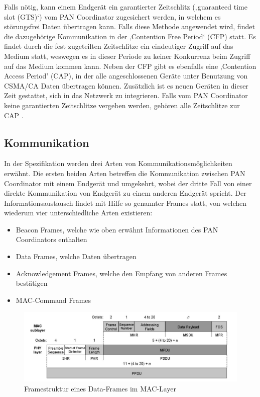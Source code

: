 Falls nötig, kann einem Endgerät ein garantierter Zeitschlitz (‚guaranteed time slot (GTS)‘) vom PAN Coordinator zugesichert werden, in welchem es störungsfrei Daten übertragen kann. Falls diese Methode angewendet wird, findet die dazugehörige Kommunikation in der ‚Contention Free Period‘ (CFP) statt. Es findet durch die fest zugeteilten Zeitschlitze ein eindeutiger Zugriff auf das Medium statt, weswegen es in dieser Periode zu keiner Konkurrenz beim Zugriff auf das Medium kommen kann. Neben der CFP gibt es ebenfalls eine ,Contention Access Period’ (CAP), in der alle angeschlossenen Geräte unter Benutzung von CSMA/CA Daten übertragen können. Zusätzlich ist es neuen Geräten in dieser Zeit gestattet, sich in das Netzwerk zu integrieren. Falls vom PAN Coordinator keine garantierten Zeitschlitze vergeben werden, gehören alle Zeitschlitze zur CAP \cite{d:hesse} \cite{d:ieee}.

\subsection{Kommunikation}\label{ss:Kommunikation}

In der Spezifikation werden drei Arten von Kommunikationsmöglichkeiten erwähnt. Die ersten beiden Arten betreffen die Kommunikation zwischen PAN Coordinator mit einem Endgerät und umgekehrt, wobei der dritte Fall von einer direkte Kommunikation von Endgerät zu einem anderen Endgerät spricht. Der Informationsaustausch findet mit Hilfe so genannter Frames statt, von welchen wiederum vier unterschiedliche Arten existieren:

\begin{itemize}
\item Beacon Frames, welche wie oben erwähnt Informationen des PAN Coordinators enthalten
\item Data Frames, welche Daten übertragen
\item Acknowledgement Frames, welche den Empfang von anderen Frames bestätigen
\item MAC-Command Frames
\end{itemize}

\begin{figure}[H] 
	\centering
	\includegraphics[scale=0.5]{Bilder/frameieee}
	\caption{Framestruktur eines Data-Frames im MAC-Layer\cite{d:ieee}}
	\label{f:frameieee}
\end{figure}

